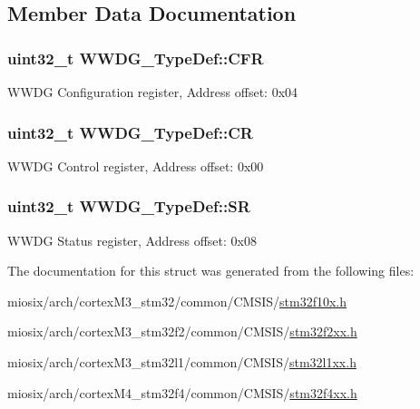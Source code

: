 \subsection{Member Data Documentation}
\hypertarget{struct_w_w_d_g___type_def_adcd6a7e5d75022e46ce60291f4b8544c}{
\subsubsection[{C\-F\-R}]{ uint32\-\_\-t W\-W\-D\-G\-\_\-\-Type\-Def\-::\-C\-F\-R}}\label{struct_w_w_d_g___type_def_adcd6a7e5d75022e46ce60291f4b8544c}
W\-W\-D\-G Configuration register, Address offset\-: 0x04 \hypertarget{struct_w_w_d_g___type_def_a4caf530d45f7428c9700d9c0057135f8}{
\subsubsection[{C\-R}]{ uint32\-\_\-t W\-W\-D\-G\-\_\-\-Type\-Def\-::\-C\-R}}\label{struct_w_w_d_g___type_def_a4caf530d45f7428c9700d9c0057135f8}
W\-W\-D\-G Control register, Address offset\-: 0x00 \hypertarget{struct_w_w_d_g___type_def_a15655cda4854cc794db1f27b3c0bba38}{
\subsubsection[{S\-R}]{ uint32\-\_\-t W\-W\-D\-G\-\_\-\-Type\-Def\-::\-S\-R}}\label{struct_w_w_d_g___type_def_a15655cda4854cc794db1f27b3c0bba38}
W\-W\-D\-G Status register, Address offset\-: 0x08 

The documentation for this struct was generated from the following files\-:\begin{DoxyCompactItemize}
\item 
miosix/arch/cortex\-M3\-\_\-stm32/common/\-C\-M\-S\-I\-S/\hyperlink{stm32f10x_8h}{stm32f10x.\-h}\item 
miosix/arch/cortex\-M3\-\_\-stm32f2/common/\-C\-M\-S\-I\-S/\hyperlink{stm32f2xx_8h}{stm32f2xx.\-h}\item 
miosix/arch/cortex\-M3\-\_\-stm32l1/common/\-C\-M\-S\-I\-S/\hyperlink{stm32l1xx_8h}{stm32l1xx.\-h}\item 
miosix/arch/cortex\-M4\-\_\-stm32f4/common/\-C\-M\-S\-I\-S/\hyperlink{stm32f4xx_8h}{stm32f4xx.\-h}\end{DoxyCompactItemize}
